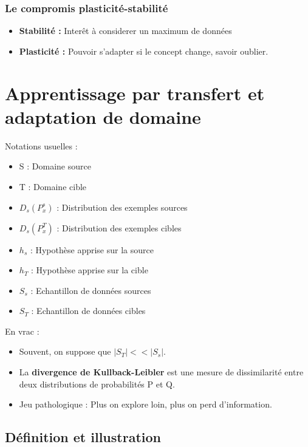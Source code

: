 \documentclass{article}
\begin{document}
\subsubsection*{Le compromis plasticité-stabilité}

\begin{itemize}
\item \textbf{Stabilité :} Interêt à considerer un maximum de données
\item \textbf{Plasticité :} Pouvoir s'adapter si le concept change, savoir oublier.
\end{itemize}

\section{Apprentissage par transfert et adaptation de domaine}

Notations usuelles : 
\begin{itemize}
\item S : Domaine source
\item T : Domaine cible
\item $D_s (P_x^s)$ : Distribution des exemples sources
\item $D_s (P_x^T)$ : Distribution des exemples cibles
\item $h_s$ : Hypothèse apprise sur la source
\item $h_T$ : Hypothèse apprise sur la cible
\item $S_s$ : Echantillon de données sources
\item $S_T$ : Echantillon de données cibles
\end{itemize}

En vrac :

\begin{itemize}

\item Souvent, on suppose que $ |S_T| << |S_s| $.

\item La \textbf{divergence de Kullback-Leibler} est une mesure de dissimilarité entre deux distributions de probabilités P et Q.

\item Jeu pathologique : Plus on explore loin, plus on perd d'information.

\end{itemize}

\subsection{Définition et illustration}
\end{document}
